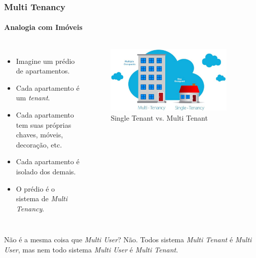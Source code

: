 \documentclass[
	9pt, %
	t, %
]{beamer}
\begin{document}
\begin{frame}
	\frametitle{Multi Tenancy}
	\framesubtitle{Analogia com Imóveis}
	
	\begin{columns}
		\begin{itemize}
			\item Imagine um prédio de apartamentos.
			\item Cada apartamento é um \textit{tenant}.
			\item Cada apartamento tem suas próprias chaves, móveis, decoração, etc.
			\item Cada apartamento é isolado dos demais.
			\item O prédio é o sistema de \textit{Multi Tenancy}.
		\end{itemize}

		\begin{figure}
			\centering
			\includegraphics[width=0.9\textwidth]{multitenancy_imoveis.jpg}
			\caption{Single Tenant vs. Multi Tenant}
		\end{figure}

	\end{columns}

	\begin{block}{Não é a mesma coisa que \textit{Multi User}?}
		Não. Todos sistema \textit{Multi Tenant} é \textit{Multi User}, mas nem todo sistema \textit{Multi User} é \textit{Multi Tenant}.
	\end{block}

\end{frame}
\end{document}
